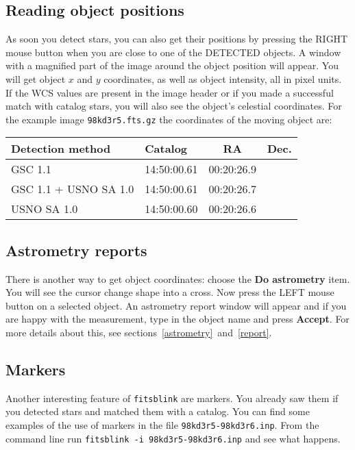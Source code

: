 \documentclass[11pt]{article}
\begin{document}
\subsection{Reading object positions}

As soon you detect stars, you can also get their positions by pressing
the RIGHT mouse button when you are close to one of the DETECTED
objects.  A window with a magnified part of the image around the
object position will appear.  You will get object $x$ and $y$
coordinates, as well as object intensity, all in pixel units.  If the
WCS values are present in the image header or if you made a successful
match with catalog stars, you will also see the object's celestial
coordinates.  For the example image \verb=98kd3r5.fts.gz= the
coordinates of the moving object are:

\begin{tabular}{l|l|c|c}
Detection method & Catalog & RA & Dec. \\
\hline
GSC 1.1 & 14:50:00.61 & 00:20:26.9 \\
GSC 1.1 + USNO SA 1.0 & 14:50:00.61 & 00:20:26.7 \\
USNO SA 1.0  & 14:50:00.60 & 00:20:26.6 \\
\end{tabular}

\subsection{Astrometry reports}

There is another way to get object coordinates: choose the \textbf{Do
astrometry} item.  You will see the cursor change shape into a
cross. Now press the LEFT mouse button on a selected object.  An
astrometry report window will appear and if you are happy with the
measurement, type in the object name and press \textbf{Accept}.  For
more details about this, see
sections~\ref{astrometry}~and~\ref{report}.

\subsection{Markers}

Another interesting feature of \verb=fitsblink= are markers.  You
already saw them if you detected stars and matched them with a
catalog.  You can find some examples of the use of markers in the file
\verb=98kd3r5-98kd3r6.inp=.  From the command line run 
\verb=fitsblink -i 98kd3r5-98kd3r6.inp= and see what happens.
\end{document}
